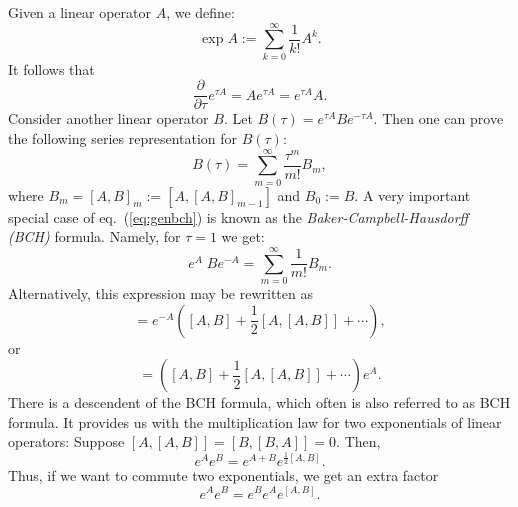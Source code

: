 \documentclass[12pt]{article}
\begin{document}
Given a linear operator $A$, we define:
\begin{equation}
\exp{A} := \sum_{k=0}^{\infty} \frac{1}{k!}A^k.
\end{equation}
It follows that
\begin{equation}
\frac{\partial}{\partial \tau} e^{\tau A} = A e^{\tau A}= e^{\tau A} A.
\end{equation}
Consider another linear operator $B$. Let $B(\tau)=e^{\tau A} B e^{-\tau A}$. Then one can prove the following series representation for $B(\tau)$:
\begin{equation}\label{eq:genbch}
B(\tau)= \sum_{m=0}^{\infty} \frac{{\tau}^m}{m!}B_m,
\end{equation}
where $B_m =[A,B]_m := [A,[A,B]_{m-1}]$  and $B_0:=B$.
A very important special case of eq.~(\ref{eq:genbch}) is known as the 
{\sl Baker-Campbell-Hausdorff (BCH)} formula. Namely, for $\tau =1$ we get:
\begin{equation}
e^A \; B e^{-A} = \sum_{m=0}^{\infty} \frac{1}{m!} B_m.
\end{equation}
Alternatively, this expression may be rewritten as
\begin{equation}
[B,e^{-A}] = e^{-A} \left( [A,B]+\frac{1}{2} [A,[A,B]] + \cdots  
\right),
\end{equation}
or 
\begin{equation}
[e^A,B] = \left( [A,B]+\frac{1}{2} [A,[A,B]] + \cdots  
\right) e^A.
\end{equation}
There is a descendent of the BCH formula, which often is also referred to as BCH
formula. It provides us with the multiplication law for two exponentials of linear operators: Suppose $[A,[A,B]] = [B,[B,A]] = 0$. Then,
\begin{equation}
e^A e^B = e^{A+B} e^{\frac{1}{2}[A,B]}.
\end{equation}
Thus, if we want to commute two exponentials, we get an extra factor
\begin{equation}
e^A e^B = e^B e^A e^{[A,B]}.
\end{equation}
\end{document}
